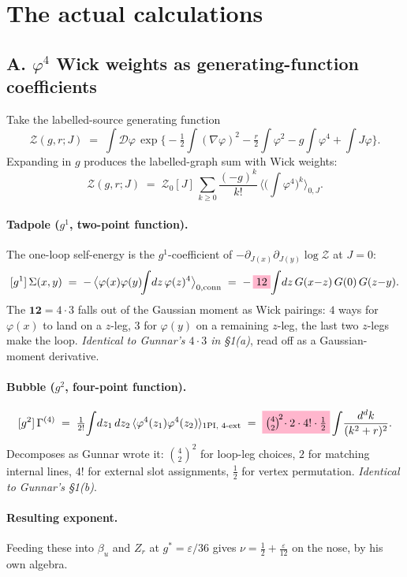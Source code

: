 \documentclass[11pt,a4paper]{article}
\newcommand{\hpink}[1]{\colorbox{gunnarpink}{$#1$}}
\begin{document}
\appendix
\section{The actual calculations}

\subsection{A. $\varphi^4$ Wick weights as generating-function coefficients}

Take the labelled-source generating function
\[
\mathcal{Z}(g,r;J) \;=\; \int\!\mathcal{D}\varphi\,\exp\!\Big\{-\tfrac{1}{2}\!\int(\nabla\varphi)^2 - \tfrac{r}{2}\!\int\varphi^2 - g\!\int\varphi^4 + \!\int J\varphi\Big\}.
\]
Expanding in $g$ produces the labelled-graph sum with Wick weights:
\[
\mathcal{Z}(g,r;J) \;=\; \mathcal{Z}_0[J]\,\sum_{k\ge 0}\frac{(-g)^k}{k!}\,\Big\langle\!\Big(\!\int\varphi^4\Big)^{\!k}\Big\rangle_{\!0,J}.
\]

\paragraph{Tadpole ($g^1$, two-point function).}
The one-loop self-energy is the $g^1$-coefficient of $-\partial_{J(x)}\partial_{J(y)}\log\mathcal{Z}$ at $J=0$:
\[
[g^1]\,\Sigma(x,y) \;=\; -\,\big\langle\varphi(x)\varphi(y)\!\!\int\!dz\,\varphi(z)^4\big\rangle_{0,\text{conn}} \;=\; -\,\hpink{12}\!\int\!dz\, G(x{-}z)\,G(0)\,G(z{-}y).
\]
The $\mathbf{12}{=}4\cdot 3$ falls out of the Gaussian moment as Wick pairings: $4$ ways for $\varphi(x)$ to land on a $z$-leg, $3$ for $\varphi(y)$ on a remaining $z$-leg, the last two $z$-legs make the loop. \emph{Identical to Gunnar's $4\cdot 3$ in §1(a)}, read off as a Gaussian-moment derivative.

\paragraph{Bubble ($g^2$, four-point function).}
\[
[g^2]\,\Gamma^{(4)} \;=\; \tfrac{1}{2!}\!\int\!dz_1\,dz_2\,\langle\varphi^4(z_1)\varphi^4(z_2)\rangle_{\text{1PI, 4-ext}} \;=\; \hpink{\tbinom{4}{2}^{\!2}\!\cdot 2\cdot 4!\cdot\tfrac{1}{2}}\,\!\int\!\frac{d^d k}{(k^2+r)^2}.
\]
Decomposes as Gunnar wrote it: $\binom{4}{2}^2$ for loop-leg choices, $2$ for matching internal lines, $4!$ for external slot assignments, $\tfrac{1}{2}$ for vertex permutation. \emph{Identical to Gunnar's §1(b)}.

\paragraph{Resulting exponent.} Feeding these into $\beta_u$ and $Z_r$ at $g^*{=}\varepsilon/36$ gives $\nu=\tfrac{1}{2}+\tfrac{\varepsilon}{12}$ on the nose, by his own algebra.
\end{document}
